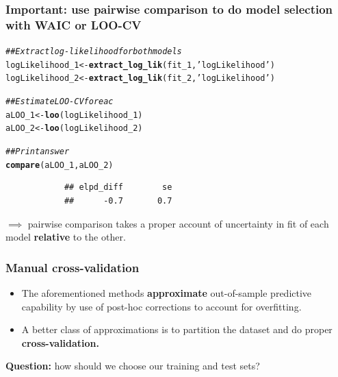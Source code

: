 \documentclass[handout]{beamer}
\makeatletter
\newcommand{\hlstr}[1]{\textcolor[rgb]{0.192,0.494,0.8}{#1}}%
\newcommand{\hlcom}[1]{\textcolor[rgb]{0.678,0.584,0.686}{\textit{#1}}}%
\newcommand{\hlstd}[1]{\textcolor[rgb]{0.345,0.345,0.345}{#1}}%
\newcommand{\hlkwb}[1]{\textcolor[rgb]{0.69,0.353,0.396}{#1}}%
\newcommand{\hlkwd}[1]{\textcolor[rgb]{0.737,0.353,0.396}{\textbf{#1}}}%
\newenvironment{kframe}{%
	\def\at@end@of@kframe{}%
	\ifinner\ifhmode%
	\def\at@end@of@kframe{\end{minipage}}%
\begin{minipage}{\columnwidth}%
	\fi\fi%
	\def\FrameCommand##1{\hskip\@totalleftmargin \hskip-\fboxsep
		\colorbox{shadecolor}{##1}\hskip-\fboxsep
		\hskip-\linewidth \hskip-\@totalleftmargin \hskip\columnwidth}%
	\MakeFramed {\advance\hsize-\width
		\@totalleftmargin\z@ \linewidth\hsize
		\@setminipage}}%
{\par\unskip\endMakeFramed%
	\at@end@of@kframe}
\newenvironment{knitrout}{}{} %
\makeatother
\begin{document}
\begin{frame}[fragile]
	\frametitle{Important: use pairwise comparison to do model selection with WAIC or LOO-CV}
	\begin{knitrout}
		\footnotesize
		\color{fgcolor}\begin{kframe}
			\begin{alltt}
				\hlcom{## Extract log-likelihood for both models}
				\hlstd{logLikelihood_1} \hlkwb{<-} \hlkwd{extract_log_lik}\hlstd{(fit_1,}\hlstr{'logLikelihood'}\hlstd{)}
				\hlstd{logLikelihood_2} \hlkwb{<-} \hlkwd{extract_log_lik}\hlstd{(fit_2,}\hlstr{'logLikelihood'}\hlstd{)}
				
				\hlcom{## Estimate LOO-CV for eac}
				\hlstd{aLOO_1} \hlkwb{<-} \hlkwd{loo}\hlstd{(logLikelihood_1)}
				\hlstd{aLOO_2} \hlkwb{<-} \hlkwd{loo}\hlstd{(logLikelihood_2)}
				
				\hlcom{## Print answer}
				\hlkwd{compare}\hlstd{(aLOO_1,aLOO_2)}
			\end{alltt}
			\begin{verbatim}
			## elpd_diff        se 
			##      -0.7       0.7
			\end{verbatim}
		\end{kframe}
	\end{knitrout}
	$\implies$ pairwise comparison takes a proper account of uncertainty in fit of each model \textbf{relative} to the other.
\end{frame}

\begin{frame}
	\frametitle{Manual cross-validation}
	\begin{itemize}
		\item<2-> The aforementioned methods \textbf{approximate} out-of-sample predictive capability by use of post-hoc corrections to account for overfitting.
		\item<3-> A better class of approximations is to partition the dataset and do proper \textbf{cross-validation.}
	\end{itemize}
	
	\textbf{Question:} how should we choose our training and test sets?
	
\end{frame}
\end{document}
